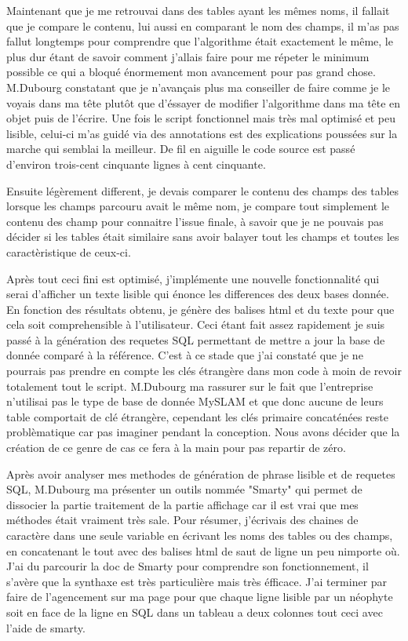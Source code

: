 Maintenant que je me retrouvai dans des tables ayant les mêmes noms, il fallait que je compare le contenu, lui aussi en comparant le nom des champs, il m'as pas fallut
longtemps pour comprendre que l'algorithme était exactement le même, le plus dur étant de savoir comment j'allais faire pour me répeter le minimum possible ce qui a bloqué
énormement mon avancement pour pas grand chose. M.Dubourg constatant que je n'avançais plus ma conseiller de faire comme je le voyais dans ma tête plutôt que d'éssayer de
modifier l'algorithme dans ma tête en objet puis de l'écrire. Une fois le script fonctionnel mais très mal optimisé et peu lisible, celui-ci m'as guidé via des annotations
est des explications poussées sur la marche qui semblai la meilleur. De fil en aiguille le code source est passé d'environ trois-cent cinquante lignes à cent cinquante.

Ensuite légèrement different, je devais comparer le contenu des champs des tables lorsque les champs parcouru avait le même nom, je compare tout
simplement le contenu des champ pour connaitre l'issue finale, à savoir que je ne pouvais pas décider si les tables était similaire sans avoir balayer
tout les champs et toutes les caractèristique de ceux-ci.

Après tout ceci fini est optimisé, j'implémente une nouvelle fonctionnalité qui serai d'afficher un texte lisible qui énonce les differences des deux
bases donnée. En fonction des résultats obtenu, je génère des balises html et du texte pour que cela soit comprehensible à l'utilisateur. Ceci étant
fait assez rapidement je suis passé à la génération des requetes SQL permettant de mettre a jour la base de donnée comparé à la référence. C'est à ce
stade que j'ai constaté que je ne pourrais pas prendre en compte les clés étrangère dans mon code à moin de revoir totalement tout le script.
M.Dubourg ma rassurer sur le fait que l'entreprise n'utilisai pas le type de base de donnée MySLAM et que donc aucune de leurs table comportait de clé
étrangère, cependant les clés primaire concaténées reste problèmatique car pas imaginer pendant la conception. Nous avons décider que la création de
ce genre de cas ce fera à la main pour pas repartir de zéro.

Après avoir analyser mes methodes de génération de phrase lisible et de requetes SQL, M.Dubourg ma présenter un outils nommée "Smarty" qui permet de
dissocier la partie traitement de la partie affichage car il est vrai que mes méthodes était vraiment très sale. Pour résumer, j'écrivais des chaines
de caractère dans une seule variable en écrivant les noms des tables ou des champs, en concatenant le tout avec des balises html de saut de ligne un
peu nimporte où. J'ai du parcourir la doc de Smarty pour comprendre son fonctionnement, il s'avère que la synthaxe est très particulière mais très
éfficace. J'ai terminer par faire de l'agencement sur ma page pour que chaque ligne lisible par un néophyte soit en face de la ligne en SQL dans un
tableau a deux colonnes tout ceci avec l'aide de smarty.

